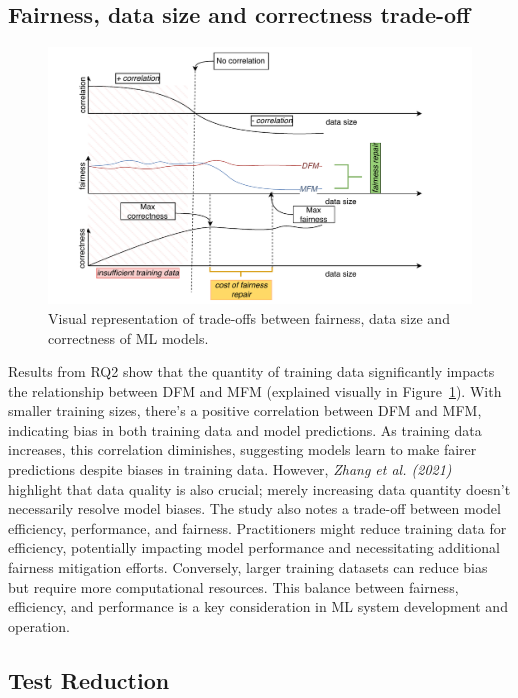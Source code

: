 \documentclass[sigconf]{acmart}
\begin{document}
\subsection{Fairness, data size and correctness trade-off}\label{sec:discuss-fair-eff-perf-trade}

\begin{figure}
  \centering
  \includegraphics[width=\linewidth]{tradeoff.pdf}
  \caption{Visual representation of trade-offs between fairness, data
    size and correctness of ML models.}
  \label{fig:tradeoff}
\end{figure}

Results from RQ2 show that the quantity of training data significantly
impacts the relationship between DFM and MFM (explained visually in
Figure~\ref{fig:tradeoff}). With smaller training sizes, there's
a positive correlation between DFM and MFM, indicating bias in both
training data and model predictions. As training data increases, this
correlation diminishes, suggesting models learn to make fairer
predictions despite biases in training data. However, \emph{Zhang et
al. (2021)}~\cite{zhang2021ignorance} highlight that data quality is
also crucial; merely increasing data quantity doesn't necessarily
resolve model biases. The study also notes a trade-off between model
efficiency, performance, and fairness. Practitioners might reduce
training data for efficiency, potentially impacting model performance
and necessitating additional fairness mitigation efforts. Conversely,
larger training datasets can reduce bias but require more
computational resources. This balance between fairness, efficiency,
and performance is a key consideration in ML system development and
operation.

\subsection{Test Reduction}\label{sec:discuss-test-red}
\end{document}
